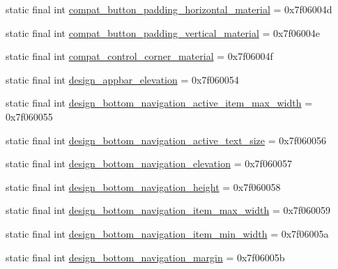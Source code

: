 \begin{DoxyCompactItemize}
\item 
static final int \mbox{\hyperlink{classandroid_1_1support_1_1design_1_1_r_1_1dimen_acc77a2bb0fa27443546ec1629a172e1a}{compat\+\_\+button\+\_\+padding\+\_\+horizontal\+\_\+material}} = 0x7f06004d
\item 
static final int \mbox{\hyperlink{classandroid_1_1support_1_1design_1_1_r_1_1dimen_aba24eef96a56ca19c8a675592fcf63ee}{compat\+\_\+button\+\_\+padding\+\_\+vertical\+\_\+material}} = 0x7f06004e
\item 
static final int \mbox{\hyperlink{classandroid_1_1support_1_1design_1_1_r_1_1dimen_ac6b7b07c02b4d17dc85b13f06920288f}{compat\+\_\+control\+\_\+corner\+\_\+material}} = 0x7f06004f
\item 
static final int \mbox{\hyperlink{classandroid_1_1support_1_1design_1_1_r_1_1dimen_ad02702f8e442d5ce2161992d960183a4}{design\+\_\+appbar\+\_\+elevation}} = 0x7f060054
\item 
static final int \mbox{\hyperlink{classandroid_1_1support_1_1design_1_1_r_1_1dimen_ac2c5edeb19c307d2cd85bc943a26be7b}{design\+\_\+bottom\+\_\+navigation\+\_\+active\+\_\+item\+\_\+max\+\_\+width}} = 0x7f060055
\item 
static final int \mbox{\hyperlink{classandroid_1_1support_1_1design_1_1_r_1_1dimen_a3faeaf48adf0ce34f4311f8de6cca331}{design\+\_\+bottom\+\_\+navigation\+\_\+active\+\_\+text\+\_\+size}} = 0x7f060056
\item 
static final int \mbox{\hyperlink{classandroid_1_1support_1_1design_1_1_r_1_1dimen_ab72af6173c7d824d7c1f99f8dc8a37a6}{design\+\_\+bottom\+\_\+navigation\+\_\+elevation}} = 0x7f060057
\item 
static final int \mbox{\hyperlink{classandroid_1_1support_1_1design_1_1_r_1_1dimen_a3d6aa9839e81ba7fe327f28c2a590f28}{design\+\_\+bottom\+\_\+navigation\+\_\+height}} = 0x7f060058
\item 
static final int \mbox{\hyperlink{classandroid_1_1support_1_1design_1_1_r_1_1dimen_aca1afc86a6cd7a315e45f3dbfe6bf379}{design\+\_\+bottom\+\_\+navigation\+\_\+item\+\_\+max\+\_\+width}} = 0x7f060059
\item 
static final int \mbox{\hyperlink{classandroid_1_1support_1_1design_1_1_r_1_1dimen_ad927a1758c4919be79e3897a1f5c56db}{design\+\_\+bottom\+\_\+navigation\+\_\+item\+\_\+min\+\_\+width}} = 0x7f06005a
\item 
static final int \mbox{\hyperlink{classandroid_1_1support_1_1design_1_1_r_1_1dimen_a72a0b5e2c6d824f22e1b3bccb7ab495f}{design\+\_\+bottom\+\_\+navigation\+\_\+margin}} = 0x7f06005b

\end{DoxyCompactItemize}
